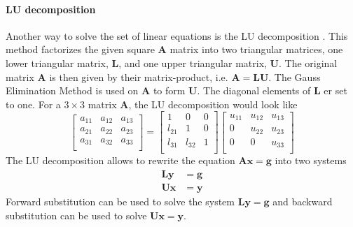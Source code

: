 \documentclass[%
oneside,                 %
final,                   %
10pt]{article}
\begin{document}
\paragraph{LU decomposition}
Another way to solve the set of linear equations is the LU decomposition  \cite{LUdecomp}.
This method factorizes the given square $\mathbf{A}$ matrix into two triangular matrices, one lower triangular matrix, $ \mathbf{L}$, and one upper triangular matrix, $\mathbf{U}$.
The original matrix $\mathbf{A}$ is then given by their matrix-product, i.e. $ \mathbf{A}= \mathbf{L} \mathbf{U}$.
The Gauss Elimination Method is used on $\mathbf{A}$ to form $\mathbf{U}$.
The diagonal elements of $\mathbf{L}$ er set to one. For a $3 \times 3$ matrix $\mathbf{A}$, the LU decomposition would look like
\[
     \begin{bmatrix}
                           a_{11}	& a_{12} & a_{13} \\
                           a_{21} & a_{22} & a_{23}  \\
                           a_{31} & a_{32} & a_{33}  \\
                      \end{bmatrix}
  =\begin{bmatrix}
                           1		& 0 & 0 \\
                           l_{21} & 1 & 0  \\
                           l_{31} & l_{32} & 1  \\
                      \end{bmatrix}
   \begin{bmatrix}
                           u_{11}& u_{12} & u_{13} \\
                           0 		& u_{22} & u_{23}  \\
                           0 		& 0 & u_{33}  \\
                      \end{bmatrix}
\]
The LU decomposition allows to rewrite the equation $\mathbf{Ax} = \mathbf{g}$ into two systems
\begin{equation}
\begin{aligned}
\mathbf{Ly} &= \mathbf{g} \\
\mathbf{Ux} &= \mathbf{y}
\end{aligned}
\end{equation}
Forward substitution can be used to solve the system $\mathbf{Ly} = \mathbf{g}$ and backward substitution can be used to solve $\mathbf{Ux} = \mathbf{y}$.
\end{document}
